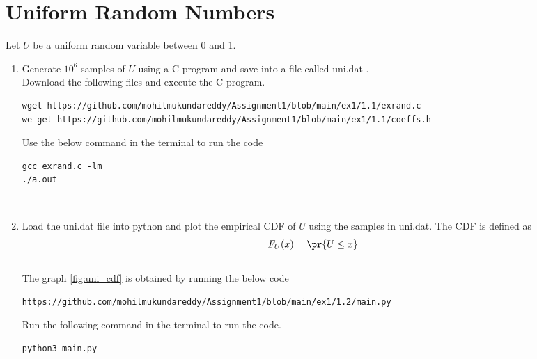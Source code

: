 \documentclass[journal,12pt,twocolumn]{IEEEtran}
\renewcommand\thesection{\arabic{section}}
\begin{document}
\section{Uniform Random Numbers}
Let $U$ be a uniform random variable between 0 and 1.
\begin{enumerate}[label=\thesection.\arabic*
,ref=\thesection.\theenumi]
\item Generate $10^6$ samples of $U$ using a C program and save into a file called uni.dat .
\\
\solution Download the following files and execute the  C program.
\begin{lstlisting}
wget https://github.com/mohilmukundareddy/Assignment1/blob/main/ex1/1.1/exrand.c
we get https://github.com/mohilmukundareddy/Assignment1/blob/main/ex1/1.1/coeffs.h
\end{lstlisting}
Use the below command in the terminal to run the code
\begin{lstlisting}
gcc exrand.c -lm
./a.out
\end{lstlisting}
\\
%
\item
Load the uni.dat file into python and plot the empirical CDF of $U$ using the samples in uni.dat. The CDF is defined as
\begin{align}
F_{U}(x) = \pr{U \le x}
\end{align}
\\
\solution 
The graph \ref{fig:uni_cdf} is obtained by running the below code
\begin{lstlisting}
https://github.com/mohilmukundareddy/Assignment1/blob/main/ex1/1.2/main.py
\end{lstlisting}
Run the following command in the terminal to run the code.\\
\begin{lstlisting}
python3 main.py
\end{lstlisting}


\end{enumerate}
\end{document}
